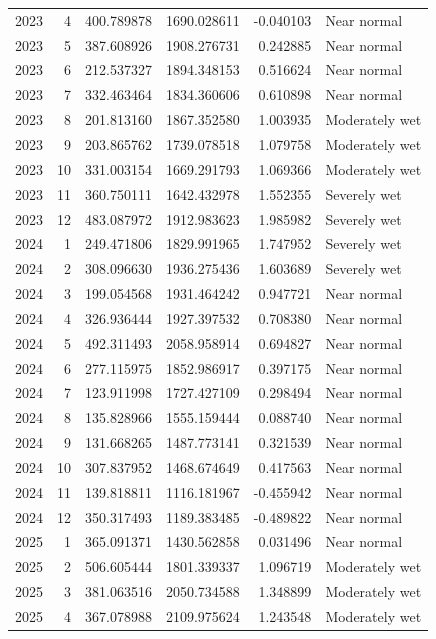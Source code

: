 \begin{tabular}{rrrrrl}
2023 & 4 & 400.789878 & 1690.028611 & -0.040103 & Near normal \\
2023 & 5 & 387.608926 & 1908.276731 & 0.242885 & Near normal \\
2023 & 6 & 212.537327 & 1894.348153 & 0.516624 & Near normal \\
2023 & 7 & 332.463464 & 1834.360606 & 0.610898 & Near normal \\
2023 & 8 & 201.813160 & 1867.352580 & 1.003935 & Moderately wet \\
2023 & 9 & 203.865762 & 1739.078518 & 1.079758 & Moderately wet \\
2023 & 10 & 331.003154 & 1669.291793 & 1.069366 & Moderately wet \\
2023 & 11 & 360.750111 & 1642.432978 & 1.552355 & Severely wet \\
2023 & 12 & 483.087972 & 1912.983623 & 1.985982 & Severely wet \\
2024 & 1 & 249.471806 & 1829.991965 & 1.747952 & Severely wet \\
2024 & 2 & 308.096630 & 1936.275436 & 1.603689 & Severely wet \\
2024 & 3 & 199.054568 & 1931.464242 & 0.947721 & Near normal \\
2024 & 4 & 326.936444 & 1927.397532 & 0.708380 & Near normal \\
2024 & 5 & 492.311493 & 2058.958914 & 0.694827 & Near normal \\
2024 & 6 & 277.115975 & 1852.986917 & 0.397175 & Near normal \\
2024 & 7 & 123.911998 & 1727.427109 & 0.298494 & Near normal \\
2024 & 8 & 135.828966 & 1555.159444 & 0.088740 & Near normal \\
2024 & 9 & 131.668265 & 1487.773141 & 0.321539 & Near normal \\
2024 & 10 & 307.837952 & 1468.674649 & 0.417563 & Near normal \\
2024 & 11 & 139.818811 & 1116.181967 & -0.455942 & Near normal \\
2024 & 12 & 350.317493 & 1189.383485 & -0.489822 & Near normal \\
2025 & 1 & 365.091371 & 1430.562858 & 0.031496 & Near normal \\
2025 & 2 & 506.605444 & 1801.339337 & 1.096719 & Moderately wet \\
2025 & 3 & 381.063516 & 2050.734588 & 1.348899 & Moderately wet \\
2025 & 4 & 367.078988 & 2109.975624 & 1.243548 & Moderately wet \\

\end{tabular}
